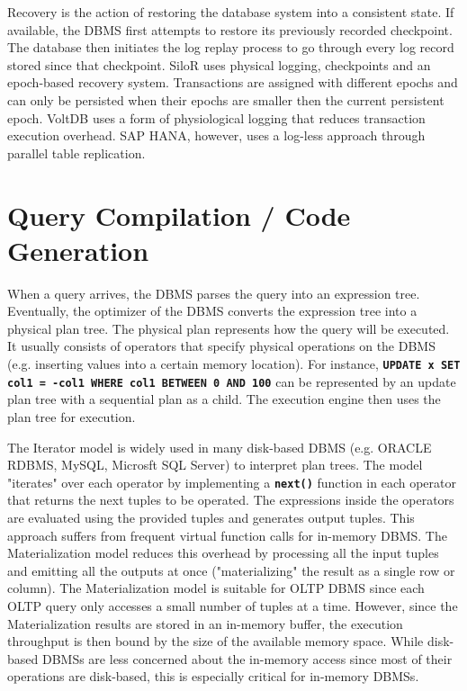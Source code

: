 \documentclass[12pt]{cmuthesis}
\newcommand{\dbSQL}[1]{\texttt{\textbf{#1}}\xspace}
\begin{document}
Recovery is the action of restoring the database system into a consistent state. If available, the DBMS first attempts to restore its previously recorded checkpoint. The database then initiates the log replay process to go through every log record stored since that checkpoint. SiloR\cite{silo_r} uses physical logging, checkpoints and an epoch-based recovery system. Transactions are assigned with different epochs and can only be persisted when their epochs are smaller then the current persistent epoch. VoltDB\cite{malviya14} uses a form of physiological logging that reduces transaction execution overhead. SAP HANA\cite{lee18}, however, uses a log-less approach through parallel table replication.

\section{Query Compilation / Code Generation}
When a query arrives, the DBMS parses the query into an expression tree. Eventually, the optimizer of the DBMS converts the expression tree into a physical plan tree. The physical plan represents how the query will be executed. It usually consists of operators that specify physical operations on the DBMS (e.g. inserting values into a certain memory location). For instance, \dbSQL{UPDATE x SET col1 = -col1 WHERE col1 BETWEEN 0 AND 100} can be represented by an update plan tree with a sequential plan as a child. The execution engine then uses the plan tree for execution.

The Iterator model\cite{volcano} is widely used in many disk-based DBMS (e.g. ORACLE RDBMS, MySQL, Microsft SQL Server) to interpret plan trees. The model "iterates" over each operator by implementing a \dbSQL{next()} function in each operator that returns the next tuples to be operated. The expressions inside the operators are evaluated using the provided tuples and generates output tuples. This approach suffers from frequent virtual function calls for in-memory DBMS. The Materialization model reduces this overhead by processing all the input tuples and emitting all the outputs at once ("materializing" the result as a single row or column). The Materialization model is suitable for OLTP DBMS since each OLTP query only accesses a small number of tuples at a time. However, since the Materialization results are stored in an in-memory buffer, the execution throughput is then bound by the size of the available memory space. While disk-based DBMSs are less concerned about the in-memory access since most of their operations are disk-based, this is especially critical for in-memory DBMSs.
\end{document}
